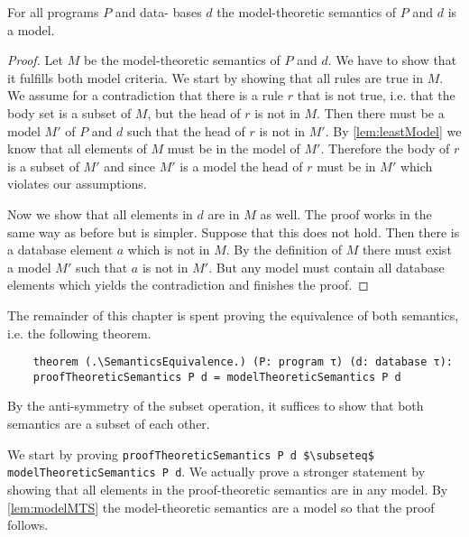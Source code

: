 \begin{lemma}[\modelTheoreticSemanticsIsModel]\label{lem:modelMTS}
    For all programs $P$ and data- bases $d$ the model-theoretic semantics of $P$ and $d$ is a model.
\end{lemma}
\begin{proof}
    Let $M$ be the model-theoretic semantics of $P$ and $d$. We have to show that it fulfills both model criteria.
    We start by showing that all rules are true in $M$. We assume for a contradiction that there is a rule $r$ that is not true, i.e. that the body set is a subset of $M$, but the head of $r$ is not in $M$. Then there must be a model $M'$ of $P$ and $d$ such that the head of $r$ is not in $M'$. By \cref{lem:leastModel} we know that all elements of $M$ must be in the model of $M'$. Therefore the body of $r$ is a subset of $M'$ and since $M'$ is a model the head of $r$ must be in $M'$ which violates our assumptions.

    Now we show that all elements in $d$ are in $M$ as well. The proof works in the same way as before but is simpler. Suppose that this does not hold. Then there is a database element $a$ which is not in $M$. By the definition of $M$ there must exist a model $M'$ such that $a$ is not in $M'$. But any model must contain all database elements which yields the contradiction and finishes the proof.
\end{proof}

The remainder of this chapter is spent proving the equivalence of both semantics, i.e. the following theorem.

\begin{lstlisting}
    theorem (.\SemanticsEquivalence.) (P: program τ) (d: database τ): 
    proofTheoreticSemantics P d = modelTheoreticSemantics P d
\end{lstlisting}

By the anti-symmetry of the subset operation, it suffices to show that both semantics are a subset of each other.

We start by proving \lstinline|proofTheoreticSemantics P d $\subseteq$ modelTheoreticSemantics P d|. We actually prove a stronger statement by showing that all elements in the proof-theoretic semantics are in any model. By \cref{lem:modelMTS} the model-theoretic semantics are a model so that the proof follows.

